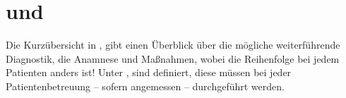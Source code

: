 % 
% 
% 
% 
% 
% 
% 
% 
% 
% 
% 
% 
% 

\begin{Literary}



\end{Literary}


\clearpage %

\section{ und }


Die Kurzübersicht in 
, gibt einen
Überblick über die mögliche weiterführende Diagnostik, die
Anamnese und Maßnahmen, wobei die
Reihenfolge bei jedem Patienten anders ist!
Unter , 
 sind  definiert, diese 
müssen bei jeder Patientenbetreuung -- sofern angemessen --
durchgeführt werden.



